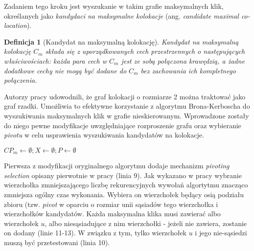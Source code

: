 \documentclass[12pt]{article}
\newtheorem{defin}{Definicja}
\begin{document}
Zadaniem tego kroku jest wyszukanie w takim grafie maksymalnych klik, określanych jako \textit{kandydaci na maksymalne kolokacje} (ang. \textit{candidate maximal co-location}).

\begin{defin}[Kandydat na maksymalną kolokację]
Kandydat na maksymalną kolokację $ C_{m} $ składa się z uporządkowanych cech przestrzennych o następujących właściwościach: każda para cech w  $ C_{m} $  jest ze sobą połączona krawędzią, a żadne dodatkowe cechy nie mogą być dodane do $ C_{m} $ bez zachowania ich kompletnego połączenia.
\end{defin}

Autorzy pracy \cite{chinczyki} udowodnili, że graf kolokacji o rozmiarze 2 można traktować jako graf rzadki. Umożliwia to efektywne korzystanie z algorytmu Brona-Kerboscha \cite{kerbosz} do wyszukiwania maksymalnych klik w grafie nieskierowanym. Wprowadzone zostały do niego pewne modyfikacje uwzględniające rozproszenie grafu oraz wybieranie \textit{pivotu} w celu usprawienia wyszukiwania kandydatów na kolokacje. 

\begin{algorithm}
$CP_{m} \leftarrow \emptyset; X \leftarrow \emptyset; P \leftarrow \emptyset$\;

\caption{Generowanie maksymalnych kandydatów na kolokacje}
\end{algorithm}

Pierwsza z modyfikacji oryginalnego algorytmu dodaje mechanizm \textit{pivoting selection} opisany pierwotnie w pracy \cite{pivot} (linia 9). Jak wykazano w pracy \cite{pivot2} wybranie wierzchołka zmniejszającego liczbę rekurencyjnych wywołań algortytmu znacząco zmniejsza ogólny czas wykonania. Wybiera on wierzchołek będący osią podziału zbioru (tzw. \textit{pivot} w oparciu o rozmiar unii sąsiadów tego wierzchołka i wierzchołków kandydatów. Każda maksymalna klika musi zawierać albo wierzchołek $ u $, albo niesąsiadujące z nim wierzchołki - jeżeli nie zawiera, zostanie on dodany (linie 11-13). W związku z tym, tylko wierzchołek $ u $ i jego nie-sąsiedzi muszą być przetestowani (linia 10).
\newline
\end{document}
